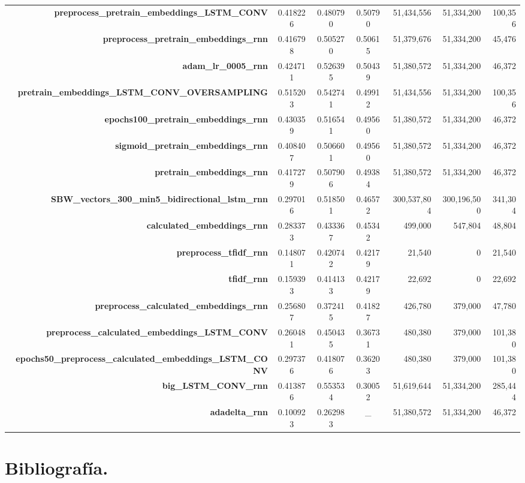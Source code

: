 \documentclass[11pt]{article}
\begin{document}
\begin{table}
{\begin{tabular}{rcccrrr}
\textbf{preprocess\_pretrain\_embeddings\_LSTM\_CONV} & 0.418226 & 0.480790 & 0.50790 & 51,434,556 & 51,334,200 & 100,356 \\
\textbf{preprocess\_pretrain\_embeddings\_rnn} & 0.416798 & 0.505270 & 0.50615 & 51,379,676 & 51,334,200 & 45,476 \\
\textbf{adam\_lr\_0005\_rnn} & 0.424711 & 0.526395 & 0.50439 & 51,380,572 & 51,334,200 & 46,372 \\
\textbf{pretrain\_embeddings\_LSTM\_CONV\_OVERSAMPLING} & 0.515203 & 0.542741 & 0.49912 & 51,434,556 & 51,334,200 & 100,356 \\
\textbf{epochs100\_pretrain\_embeddings\_rnn} & 0.430359 & 0.516541 & 0.49560 & 51,380,572 & 51,334,200 & 46,372 \\
\textbf{sigmoid\_pretrain\_embeddings\_rnn} & 0.408407 & 0.506601 & 0.49560 & 51,380,572 & 51,334,200 & 46,372 \\
\textbf{pretrain\_embeddings\_rnn} & 0.417279 & 0.507906 & 0.49384 & 51,380,572 & 51,334,200 & 46,372 \\
\textbf{SBW\_vectors\_300\_min5\_bidirectional\_lstm\_rnn} & 0.297016 & 0.518501 & 0.46572 & 300,537,804 & 300,196,500 & 341,304 \\
\textbf{calculated\_embeddings\_rnn} & 0.283373 & 0.433367 & 0.45342 & 499,000 & 547,804 & 48,804 \\
\textbf{preprocess\_tfidf\_rnn} & 0.148071 & 0.420742 & 0.42179 & 21,540 & 0 & 21,540 \\
\textbf{tfidf\_rnn} & 0.159393 & 0.414133 & 0.42179 & 22,692 & 0 & 22,692 \\
\textbf{preprocess\_calculated\_embeddings\_rnn} & 0.256807 & 0.372415 & 0.41827 & 426,780 & 379,000 & 47,780 \\
\textbf{preprocess\_calculated\_embeddings\_LSTM\_CONV} & 0.260481 & 0.450435 & 0.36731 & 480,380 & 379,000 & 101,380 \\
\textbf{epochs50\_preprocess\_calculated\_embeddings\_LSTM\_CONV} & 0.297376 & 0.418076 & 0.36203 & 480,380 & 379,000 & 101,380 \\
\textbf{big\_LSTM\_CONV\_rnn} & 0.413876 & 0.553534 & 0.30052 & 51,619,644 & 51,334,200 & 285,444 \\
\textbf{adadelta\_rnn} & 0.100923 & 0.262983 & \_ & 51,380,572 & 51,334,200 & 46,372
\end{tabular}}
\end{table}

\newpage
\section{Bibliografía.}
\end{document}
